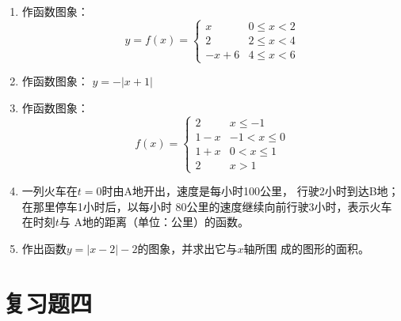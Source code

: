 
\begin{enumerate}
    \item 作函数图象：
   \[y=f(x)=\begin{cases}
       x& 0\le x<2\\
       2& 2\le x<4\\
       -x+6 & 4\le x<6
   \end{cases}\]
   \item 作函数图象：
    $y=-|x+1|$
    \item 作函数图象：
   \[f(x)=\begin{cases}
       2& x\le -1\\
       1-x& -1<x\le 0\\
       1+x & 0<x\le 1\\
       2& x>1
   \end{cases}\]
    \item 一列火车在$t=0$时由A地开出，速度是每小时100公里，
    行驶2小时到达B地；在那里停车1小时后，以每小时
    80公里的速度继续向前行驶3小时，表示火车在时刻$t$与
    A地的距离（单位：公里）的函数。
    \item 作出函数$y=|x-2|-2$的图象，并求出它与$x$轴所围
    成的图形的面积。
\end{enumerate}

\section*{复习题四}

